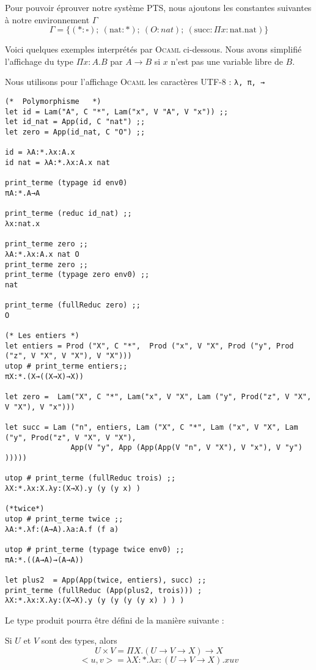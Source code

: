 Pour pouvoir éprouver notre système PTS, nous ajoutons les constantes suivantes à notre environnement $\Gamma$
$$\Gamma = \{ (*:\square) ;\ (\text{nat}:*) ;\ (O:nat) ;\ (\text{succ}:\Pi x:\text{nat}.\text{nat}) \} $$

Voici quelques exemples interprétés par \textsc{Ocaml} ci-dessous. Nous avons simplifié l'affichage
du type $\Pi x:A.B$ par $A\rightarrow B$ si $x$ n'est pas une variable libre de $B$.

Nous utilisons pour l'affichage \textsc{Ocaml} les caractères UTF-8 :  \verb+λ, π, →+

\begin{Verbatim}
(*  Polymorphisme   *)
let id = Lam("A", C "*", Lam("x", V "A", V "x")) ;;
let id_nat = App(id, C "nat") ;;
let zero = App(id_nat, C "O") ;;

id = λA:*.λx:A.x
id nat = λA:*.λx:A.x nat

print_terme (typage id env0) 
πA:*.A→A

print_terme (reduc id_nat) ;;
λx:nat.x

print_terme zero ;;
λA:*.λx:A.x nat O
print_terme zero ;;
print_terme (typage zero env0) ;;
nat

print_terme (fullReduc zero) ;;
O

(* Les entiers *)
let entiers = Prod ("X", C "*",  Prod ("x", V "X", Prod ("y", Prod ("z", V "X", V "X"), V "X")))
utop # print_terme entiers;;
πX:*.(X→((X→X)→X))

let zero =  Lam("X", C "*", Lam("x", V "X", Lam ("y", Prod("z", V "X", V "X"), V "x")))

let succ = Lam ("n", entiers, Lam ("X", C "*", Lam ("x", V "X", Lam ("y", Prod("z", V "X", V "X"),
               App(V "y", App (App(App(V "n", V "X"), V "x"), V "y") )))))

utop # print_terme (fullReduc trois) ;;
λX:*.λx:X.λy:(X→X).y (y (y x) ) 

(*twice*)
utop # print_terme twice ;;
λA:*.λf:(A→A).λa:A.f (f a) 

utop # print_terme (typage twice env0) ;;
πA:*.((A→A)→(A→A))

let plus2  = App(App(twice, entiers), succ) ;;
print_terme (fullReduc (App(plus2, trois))) ;
λX:*.λx:X.λy:(X→X).y (y (y (y (y x) ) ) )
\end{Verbatim}
Le type produit pourra être défini de la manière suivante :

Si $U$ et $V$ sont des types, alors 
$$U\times V = \Pi X.(U\rightarrow V \rightarrow X)\rightarrow X$$
$$ <u,v> = \lambda X:*.\lambda x:(U \rightarrow V \rightarrow X). x u v $$ 

